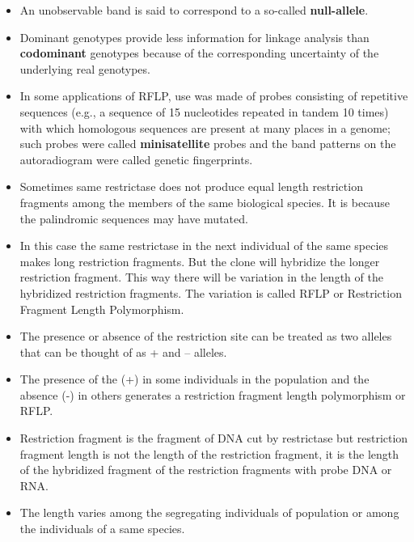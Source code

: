 \documentclass[11pt,dvipsnames,ignorenonframetext,aspectratio=169]{beamer}
\providecommand{\tightlist}{%
  \setlength{\itemsep}{0pt}\setlength{\parskip}{0pt}}
\begin{document}
\begin{frame}{}
\protect\hypertarget{section-16}{}

\begin{itemize}
\tightlist
\item
  An unobservable band is said to correspond to a so-called
  \textbf{null-allele}.
\item
  Dominant genotypes provide less information for linkage analysis than
  \textbf{codominant} genotypes because of the corresponding uncertainty
  of the underlying real genotypes.
\item
  In some applications of RFLP, use was made of probes consisting of
  repetitive sequences (e.g., a sequence of 15 nucleotides repeated in
  tandem 10 times) with which homologous sequences are present at many
  places in a genome; such probes were called \textbf{minisatellite}
  probes and the band patterns on the autoradiogram were called genetic
  fingerprints.
\end{itemize}

\end{frame}

\begin{frame}{}
\protect\hypertarget{section-17}{}

\begin{itemize}
\tightlist
\item
  Sometimes same restrictase does not produce equal length restriction
  fragments among the members of the same biological species. It is
  because the palindromic sequences may have mutated.
\item
  In this case the same restrictase in the next individual of the same
  species makes long restriction fragments. But the clone will hybridize
  the longer restriction fragment. This way there will be variation in
  the length of the hybridized restriction fragments. The variation is
  called RFLP or Restriction Fragment Length Polymorphism.
\item
  The presence or absence of the restriction site can be treated as two
  alleles that can be thought of as + and -- alleles.
\end{itemize}

\end{frame}

\begin{frame}{}
\protect\hypertarget{section-18}{}

\begin{itemize}
\tightlist
\item
  The presence of the (+) in some individuals in the population and the
  absence (-) in others generates a restriction fragment length
  polymorphism or RFLP.
\item
  Restriction fragment is the fragment of DNA cut by restrictase but
  restriction fragment length is not the length of the restriction
  fragment, it is the length of the hybridized fragment of the
  restriction fragments with probe DNA or RNA.
\item
  The length varies among the segregating individuals of population or
  among the individuals of a same species.
\end{itemize}

\end{frame}
\end{document}
